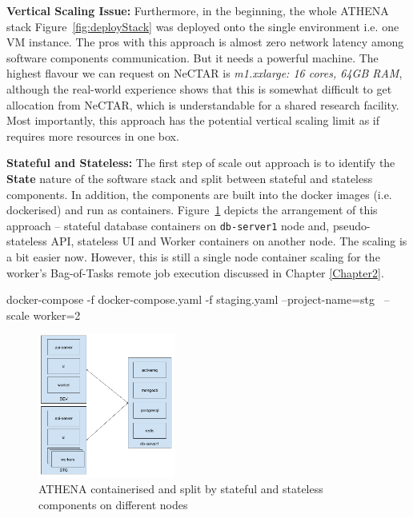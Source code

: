 \noindent \textbf{Vertical Scaling Issue:} \quad Furthermore, in the beginning, the whole ATHENA stack Figure~\ref{fig:deployStack} was deployed onto the single environment i.e. one VM instance. The pros with this approach is almost zero network latency among software components communication. But it needs a powerful machine. The highest flavour we can request on NeCTAR is \textit{m1.xxlarge: 16 cores, 64GB RAM}, although the real-world experience shows that this is somewhat difficult to get allocation from NeCTAR, which is understandable for a shared research facility. Most importantly, this approach has the potential vertical scaling limit as if requires more resources in one box.

\noindent \textbf{Stateful and Stateless:} \quad The first step of scale out approach is to identify the \textbf{State} nature of the software stack and split between stateful and stateless components. In addition, the components are built into the docker images (i.e. dockerised) and run as containers. Figure~\ref{fig:deployDockerised} depicts the arrangement of this approach -- stateful database containers on \verb|db-server1| node and, pseudo-stateless API, stateless UI and Worker containers on another node. The scaling is a bit easier now. However, this is still a single node container scaling for the worker's Bag-of-Tasks remote job execution discussed in Chapter \ref{Chapter2}.

\begin{small}
\begin{lcverbatim}
docker-compose -f docker-compose.yaml -f staging.yaml  --project-name=stg \
   --scale worker=2
\end{lcverbatim}
\end{small}

\begin{figure}[H]
\centering
\includegraphics[width=0.4\textwidth]{Figures/ATHENA_dockerize}
\decoRule
\caption[ATHENA Dockerised]{ATHENA containerised and split by stateful and stateless components on different nodes}
\label{fig:deployDockerised}
\end{figure}

